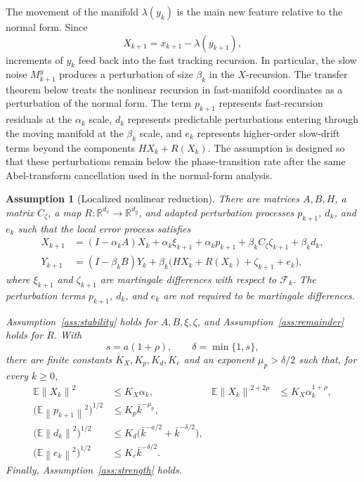 \documentclass{article}
\newtheorem{assumption}[theorem]{Assumption}
\newcommand{\R}{\mathbb{R}}
\newcommand{\E}{\mathbb{E}}
\newcommand{\norm}[1]{\left\lVert #1\right\rVert}
\begin{document}
The movement of the manifold $\lambda(y_k)$ is the main new feature relative to the normal form. Since
\[
  X_{k+1}=x_{k+1}-\lambda(y_{k+1}),
\]
increments of $y_k$ feed back into the fast tracking recursion. In particular, the slow noise $M^y_{k+1}$ produces a perturbation of size $\beta_k$ in the $X$-recursion. The transfer theorem below treats the nonlinear recursion in fast-manifold coordinates as a perturbation of the normal form. The term $p_{k+1}$ represents fast-recursion residuals at the $\alpha_k$ scale, $d_k$ represents predictable perturbations entering through the moving manifold at the $\beta_k$ scale, and $e_k$ represents higher-order slow-drift terms beyond the components $HX_k+R(X_k)$. The assumption is designed so that these perturbations remain below the phase-transition rate after the same Abel-transform cancellation used in the normal-form analysis.

\begin{assumption}[Localized nonlinear reduction]\label{ass:nonlinear-reduction}
There are matrices $A,B,H$, a matrix $C_\zeta$, a map
$R:\R^{d_x}\to\R^{d_y}$, and adapted perturbation processes
$p_{k+1}$, $d_k$, and $e_k$ such that the local error process satisfies
\begin{align}
  X_{k+1}
  &=(I-\alpha_kA)X_k+\alpha_k\xi_{k+1}
    +\alpha_k p_{k+1}
    +\beta_k C_\zeta\zeta_{k+1}
    +\beta_kd_k, \label{eq:perturbed-fast}\\
  Y_{k+1}
  &=(I-\beta_kB)Y_k
    +\beta_k\big(HX_k+R(X_k)+\zeta_{k+1}+e_k\big), \label{eq:perturbed-slow}
\end{align}
where $\xi_{k+1}$ and $\zeta_{k+1}$ are martingale differences with respect to $\mathcal F_k$. The perturbation terms $p_{k+1}$, $d_k$, and $e_k$ are not required to be martingale differences.

Assumption~\ref{ass:stability} holds for $A,B,\xi,\zeta$, and Assumption~\ref{ass:remainder} holds for $R$. With
\[
  s=a(1+\rho),
  \qquad
  \delta=\min\{1,s\},
\]
there are finite constants $K_X,K_p,K_d,K_e$ and an exponent
$\mu_p>\delta/2$ such that, for every $k\ge0$,
\begin{align}
  \E\norm{X_k}^2 &\le K_X\alpha_k,
  &
  \E\norm{X_k}^{2+2\rho} &\le K_X\alpha_k^{1+\rho}, \label{eq:transfer-fast-moments}\\
  \big(\E\norm{p_{k+1}}^2\big)^{1/2}
  &\le K_p\bar k^{-\mu_p}, \label{eq:p-bound}\\
  \big(\E\norm{d_k}^2\big)^{1/2}
  &\le K_d\big(\bar k^{-a/2}+\bar k^{-\delta/2}\big), \label{eq:d-bound}\\
  \big(\E\norm{e_k}^2\big)^{1/2}
  &\le K_e\bar k^{-\delta/2}. \label{eq:e-bound}
\end{align}
Finally, Assumption~\ref{ass:strength} holds.
\end{assumption}
\end{document}
